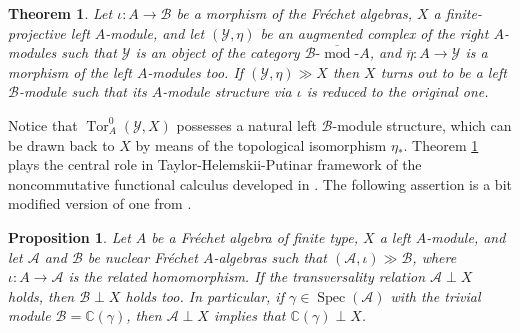 \documentclass[12pt]{amsart}%
\newtheorem{theorem}{Theorem}
\theoremstyle{plain}
\newtheorem{proposition}{Proposition}
\numberwithin{equation}{section}
\numberwithin{equation}{section}
\numberwithin{theorem}{section}
\numberwithin{lemma}{section}
\numberwithin{remark}{section}
\numberwithin{example}{section}
\numberwithin{proposition}{section}
\numberwithin{definition}{section}
\numberwithin{corollary}{section}
\begin{document}
\begin{theorem}
\label{tHTf}Let $\iota:A\rightarrow\mathcal{B}$ be a morphism of the
Fr\'{e}chet algebras, $X$ a finite-projective left $A$-module, and let
$\left(  \mathcal{Y},\eta\right)  $ be an augmented complex of the right
$A$-modules such that $\mathcal{Y}$ is an object of the category
$\overline{\mathcal{B}\text{-}\operatorname*{mod}\text{-}A}$, and
$\overline{\eta}:A\rightarrow\mathcal{Y}$ is a morphism of the left
$A$-modules too. If $\left(  \mathcal{Y},\eta\right)  \gg X$ then $X$ turns
out to be a left $\mathcal{B}$-module such that its $A$-module structure via
$\iota$ is reduced to the original one.
\end{theorem}

Notice that $\operatorname{Tor}_{A}^{0}\left(  \mathcal{Y},X\right)  $
possesses a natural left $\mathcal{B}$-module structure, which can be drawn
back to $X$ by means of the topological isomorphism $\eta_{\ast}$. Theorem
\ref{tHTf} plays the central role in Taylor-Helemskii-Putinar framework of the
noncommutative functional calculus developed in \cite{DosJOT10}. The following
assertion is a bit modified version of one from \cite[Proposition 2.7
(b)]{Tay2}.

\begin{proposition}
\label{propDom12}Let $A$ be a Fr\'{e}chet algebra of finite type, $X$ a left
$A$-module, and let $\mathcal{A}$ and $\mathcal{B}$ be nuclear Fr\'{e}chet
$A$-algebras such that $\left(  \mathcal{A},\iota\right)  \gg\mathcal{B}$,
where $\iota:A\rightarrow\mathcal{A}$ is the related homomorphism. If the
transversality relation $\mathcal{A}\perp X$ holds, then $\mathcal{B}\perp X$
holds too. In particular, if $\gamma\in\operatorname{Spec}\left(
\mathcal{A}\right)  $ with the trivial module $\mathcal{B}=\mathbb{C}\left(
\gamma\right)  $, then $\mathcal{A}\perp X$ implies that $\mathbb{C}\left(
\gamma\right)  \perp X$.
\end{proposition}
\end{document}
